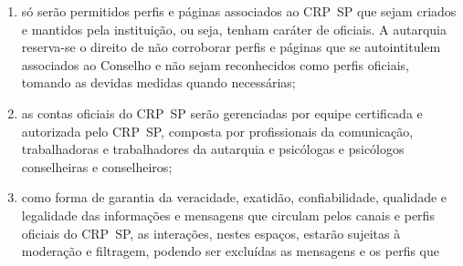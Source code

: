 \begin{enumerate}

  \item
        só serão permitidos perfis e páginas associados ao CRP~SP que sejam
        criados e mantidos pela instituição, ou seja, tenham caráter de
        oficiais. A autarquia reserva-se o direito de não corroborar perfis e
        páginas que se autointitulem associados ao Conselho e não sejam
        reconhecidos como perfis oficiais, tomando as devidas medidas quando
        necessárias;
  \item
        as contas oficiais do CRP~SP serão gerenciadas por equipe certificada
        e autorizada pelo CRP~SP, composta por profissionais da comunicação,
        trabalhadoras e trabalhadores da autarquia e psicólogas e psicólogos
        conselheiras e conselheiros;
  \item
        como forma de garantia da veracidade, exatidão, confiabilidade,
        qualidade e legalidade das informações e mensagens que circulam pelos
        canais e perfis oficiais do CRP~SP, as interações, nestes espaços,
        estarão sujeitas à moderação e filtragem, podendo ser excluídas as
        mensagens e os perfis que

        \begin{enumerate}


\end{enumerate}
\end{enumerate}
